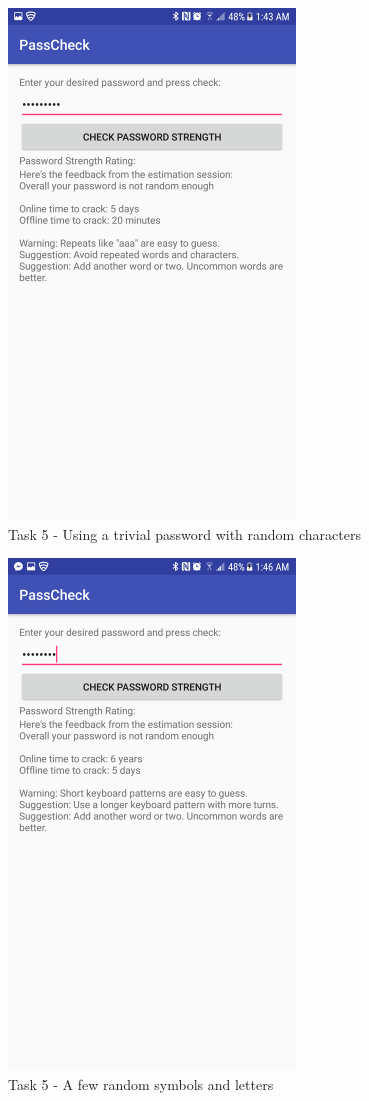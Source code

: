 \documentclass{article}
\begin{document}
	\begin{figure}[ht]
        \centerline{
            \includegraphics[width=3in]{img/t5s3.png}
        }
		\centering
		\caption{Task 5 - Using a trivial password with random characters}
	\end{figure}

	\begin{figure}[ht]
        \centerline{
            \includegraphics[width=3in]{img/t5s4.png}
        }
		\centering
		\caption{Task 5 - A few random symbols and letters}
	\end{figure}
\end{document}
